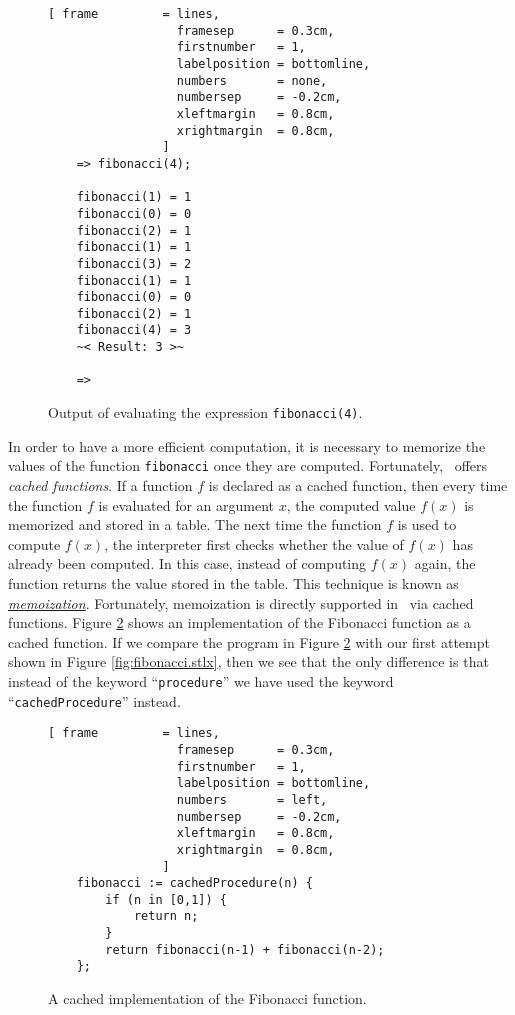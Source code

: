 \begin{figure}[!ht]
\centering
\begin{Verbatim}[ frame         = lines, 
                  framesep      = 0.3cm, 
                  firstnumber   = 1,
                  labelposition = bottomline,
                  numbers       = none,
                  numbersep     = -0.2cm,
                  xleftmargin   = 0.8cm,
                  xrightmargin  = 0.8cm,
                ]
    => fibonacci(4);
    
    fibonacci(1) = 1
    fibonacci(0) = 0
    fibonacci(2) = 1
    fibonacci(1) = 1
    fibonacci(3) = 2
    fibonacci(1) = 1
    fibonacci(0) = 0
    fibonacci(2) = 1
    fibonacci(4) = 3
    ~< Result: 3 >~
    
    => 
\end{Verbatim}
\vspace*{-0.3cm}
\caption{Output of evaluating the expression \texttt{fibonacci(4)}.}
\label{fig:fibonacci.trace}
\end{figure}


In order to have a more efficient computation, it is necessary to memorize the values of
the function \texttt{fibonacci} once they are computed.  Fortunately, \setlx\ offers
\emph{cached functions}.  If a function $f$ is declared as a cached function, then every
time the function $f$ is evaluated for an argument $x$, the computed value $f(x)$ is
memorized and stored in a table.  The next time the function $f$ is used to compute
$f(x)$, the interpreter first checks whether the value of $f(x)$ has already been
computed.  In this case, instead of computing $f(x)$ again,  the function returns the
value stored in the table.  This technique is known as
\href{http://en.wikipedia.org/wiki/Memoization}{\emph{memoization}}.
Fortunately, memoization is directly supported in \setlx\ via cached functions.
Figure
\ref{fig:fibonacci-cached.stlx} shows an implementation of the Fibonacci function as a
cached function.  If we compare the program in Figure
\ref{fig:fibonacci-cached.stlx} with our first attempt shown in Figure
\ref{fig:fibonacci.stlx}, then we see that the only difference is that instead of the
keyword ``\texttt{procedure}'' we have used the keyword ``\texttt{cachedProcedure}'' instead.


\begin{figure}[!ht]
\centering
\begin{Verbatim}[ frame         = lines, 
                  framesep      = 0.3cm, 
                  firstnumber   = 1,
                  labelposition = bottomline,
                  numbers       = left,
                  numbersep     = -0.2cm,
                  xleftmargin   = 0.8cm,
                  xrightmargin  = 0.8cm,
                ]
    fibonacci := cachedProcedure(n) {
        if (n in [0,1]) {
            return n;
        } 
        return fibonacci(n-1) + fibonacci(n-2);
    };
\end{Verbatim}
\vspace*{-0.3cm}
\caption{A cached implementation of the Fibonacci function.}
\label{fig:fibonacci-cached.stlx}
\end{figure}

